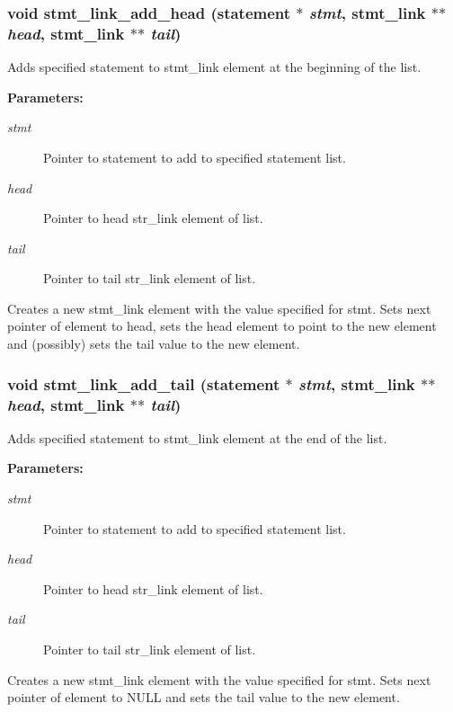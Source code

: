 \subsubsection{\setlength{\rightskip}{0pt plus 5cm}void stmt\_\-link\_\-add\_\-head ({\bf statement} $\ast$ {\em stmt}, {\bf stmt\_\-link} $\ast$$\ast$ {\em head}, {\bf stmt\_\-link} $\ast$$\ast$ {\em tail})}\label{link_8h_a1}


Adds specified statement to stmt\_\-link element at the beginning of the list.

\begin{Desc}
\item[{\bf Parameters: }]\par
\begin{description}
\item[
{\em stmt}]Pointer to statement to add to specified statement list. \item[
{\em head}]Pointer to head str\_\-link element of list. \item[
{\em tail}]Pointer to tail str\_\-link element of list.

\end{description}
\end{Desc}
Creates a new stmt\_\-link element with the value specified for stmt. Sets next pointer of element to head, sets the head element to point to the new element and (possibly) sets the tail value to the new element. 
\subsubsection{\setlength{\rightskip}{0pt plus 5cm}void stmt\_\-link\_\-add\_\-tail ({\bf statement} $\ast$ {\em stmt}, {\bf stmt\_\-link} $\ast$$\ast$ {\em head}, {\bf stmt\_\-link} $\ast$$\ast$ {\em tail})}\label{link_8h_a2}


Adds specified statement to stmt\_\-link element at the end of the list.

\begin{Desc}
\item[{\bf Parameters: }]\par
\begin{description}
\item[
{\em stmt}]Pointer to statement to add to specified statement list. \item[
{\em head}]Pointer to head str\_\-link element of list. \item[
{\em tail}]Pointer to tail str\_\-link element of list.

\end{description}
\end{Desc}
Creates a new stmt\_\-link element with the value specified for stmt. Sets next pointer of element to NULL and sets the tail value to the new element. 
